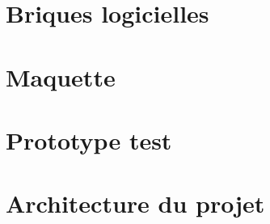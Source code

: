 \documentclass[paper=a4, fontsize=11pt]{article}
\numberwithin{equation}{section}		%
\numberwithin{figure}{section}			%
\numberwithin{table}{section}				%
\begin{document}
\section{Briques logicielles}

\section{Maquette}

\section{Prototype test}\label{sec:prototypetest}

\section{Architecture du projet}\label{sec:archi}




\end{document}
